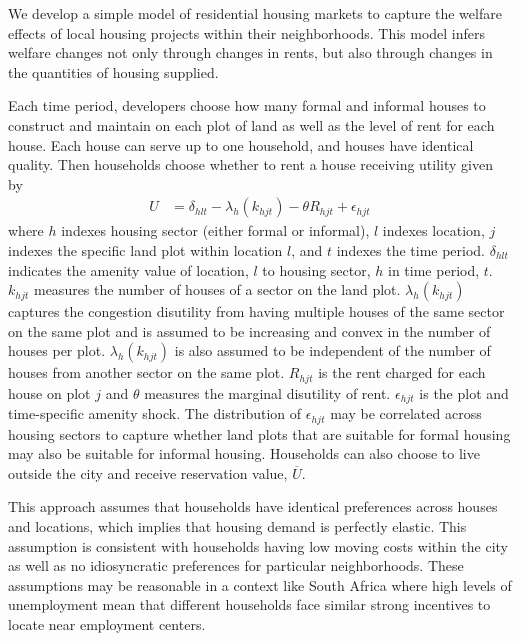 \documentclass[12pt]{article}
\begin{document}
We develop a simple model of residential housing markets to capture the welfare effects of local housing projects within their neighborhoods.  This model infers welfare changes not only through changes in rents, but also through changes in the quantities of housing supplied.  



Each time period, developers choose how many formal and informal houses to construct and maintain on each plot of land as well as the level of rent for each house.  Each house can serve up to one household, and houses have identical quality.  Then households choose whether to rent a house receiving utility given by
\begin{align*}
U &= \delta_{hlt} - \lambda_{h}(k_{hjt}) - \theta R_{hjt}   + \epsilon_{hjt}  
\end{align*}
\noindent where $h$ indexes housing sector (either formal or informal), $l$ indexes location, $j$ indexes the specific land plot within location $l$, and $t$ indexes the time period.  $\delta_{hlt}$ indicates the amenity value of location, $l$ to housing sector, $h$ in time period, $t$.  $k_{hjt}$ measures the number of houses of a sector on the land plot.  $\lambda_{h}(k_{hjt})$ captures the congestion disutility from having multiple houses of the same sector on the same plot and is assumed to be increasing and convex in the number of houses per plot.   $\lambda_{h}(k_{hjt})$ is also assumed to be independent of the number of houses from another sector on the same plot.    $R_{hjt}$ is the rent charged for each house on plot $j$ and $\theta$ measures the marginal disutility of rent.  $\epsilon_{hjt}$ is the plot and time-specific amenity shock.  The distribution of $\epsilon_{hjt}$ may be correlated across housing sectors to capture whether land plots that are suitable for formal housing may also be suitable for informal housing.  Households can also choose to live outside the city and receive reservation value, $\overline{U}$.  

This approach assumes that households have identical preferences across houses and locations, which implies that housing demand is perfectly elastic.  This assumption is consistent with households having low moving costs within the city as well as no idiosyncratic preferences for particular neighborhoods.  These assumptions may be reasonable in a context like South Africa where high levels of unemployment mean that different households face similar strong incentives to locate near employment centers.
 
\end{document}
